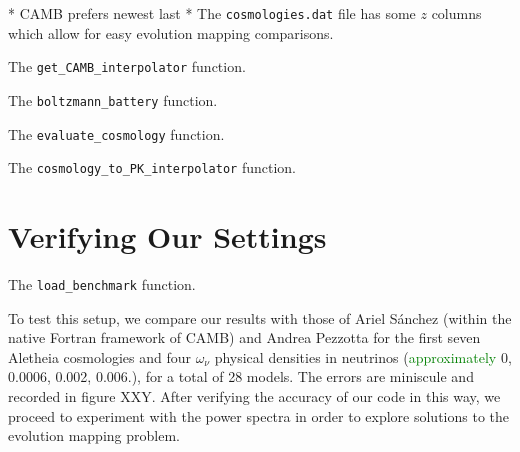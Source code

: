 * CAMB prefers newest last
* The \verb|cosmologies.dat| file has some $z$ columns which allow for easy
evolution mapping comparisons. %
	



The \verb|get_CAMB_interpolator| function.


The \verb|boltzmann_battery| function.

The \verb|evaluate_cosmology| function.

The \verb|cosmology_to_PK_interpolator| function.

\section{Verifying Our Settings}


The \verb|load_benchmark| function.


To test this setup, we compare our results with those of Ariel S\'{a}nchez 
(within the native Fortran framework of CAMB) and Andrea Pezzotta for the
first seven Aletheia cosmologies and four $\omega_\nu$ physical densities in
neutrinos (\textcolor{green}{approximately} 0, 0.0006, 0.002, 0.006.), for a 
total of 28
models. The errors are miniscule and recorded in figure XXY. After verifying
the accuracy of our code in this way, we proceed to experiment with the power
spectra in order to explore solutions to the evolution mapping problem.


